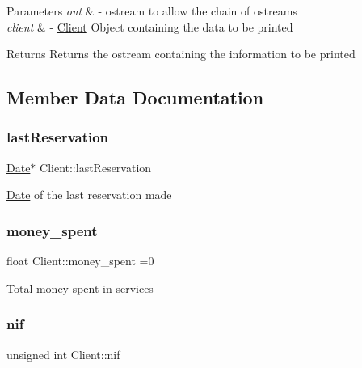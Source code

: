 \begin{DoxyParams}{Parameters}
{\em out} & -\/ ostream to allow the chain of ostreams \\
\hline
{\em client} & -\/ \hyperlink{class_client}{Client} Object containing the data to be printed \\
\hline
\end{DoxyParams}
\begin{DoxyReturn}{Returns}
Returns the ostream containing the information to be printed 
\end{DoxyReturn}


\subsection{Member Data Documentation}
\mbox{\label{class_client_a8203fe64182b1c55ef7543bfae6779af}} 
\subsubsection{\texorpdfstring{last\+Reservation}{lastReservation}}
{\footnotesize\ttfamily \hyperlink{class_date}{Date}$\ast$ Client\+::last\+Reservation\hspace{0.3cm}{\ttfamily [protected]}}

\hyperlink{class_date}{Date} of the last reservation made \mbox{\label{class_client_a9d5dc70a6eee2fded8217a7983fe5fd0}} 
\subsubsection{\texorpdfstring{money\+\_\+spent}{money\_spent}}
{\footnotesize\ttfamily float Client\+::money\+\_\+spent =0\hspace{0.3cm}{\ttfamily [protected]}}

Total money spent in services \mbox{\label{class_client_a1c94dc96a56cb5032573fb1d528517c2}} 
\subsubsection{\texorpdfstring{nif}{nif}}
{\footnotesize\ttfamily unsigned int Client\+::nif\hspace{0.3cm}{\ttfamily [protected]}}

